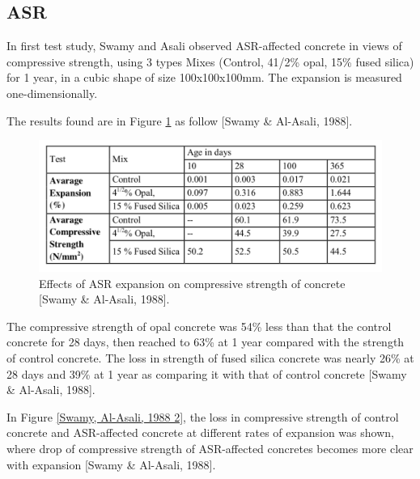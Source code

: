 \subsection{ASR}



In first test study, Swamy and Asali observed ASR-affected concrete in views of compressive strength, using 3 types Mixes (Control, 41/2\% opal, 15\% fused silica) for 1 year, in a cubic shape of size 100x100x100mm. The expansion is measured one-dimensionally.

The results found are in Figure \ref{Swamy1} as follow [Swamy \& Al-Asali, 1988].

\begin{figure}[h!]
  \centering
  \includegraphics[width=0.8\linewidth]{Reference/temp3.png}
  \caption{Effects of ASR expansion on compressive strength of concrete [Swamy \& Al-Asali, 1988].}
  \label{Swamy1}
\end{figure}


The compressive strength of opal concrete was 54\% less than that the control concrete for 28 days, then reached to 63\% at 1 year compared with the strength of control concrete. The loss in strength of fused silica concrete was nearly 26\% at 28 days and 39\% at 1 year as comparing it with that of control concrete [Swamy \& Al-Asali, 1988].

In Figure \ref{Swamy, Al-Asali, 1988 2}, the loss in compressive strength of control concrete and ASR-affected concrete at different rates of expansion was shown, where drop of compressive strength of ASR-affected concretes becomes more clear with expansion [Swamy \& Al-Asali, 1988].

